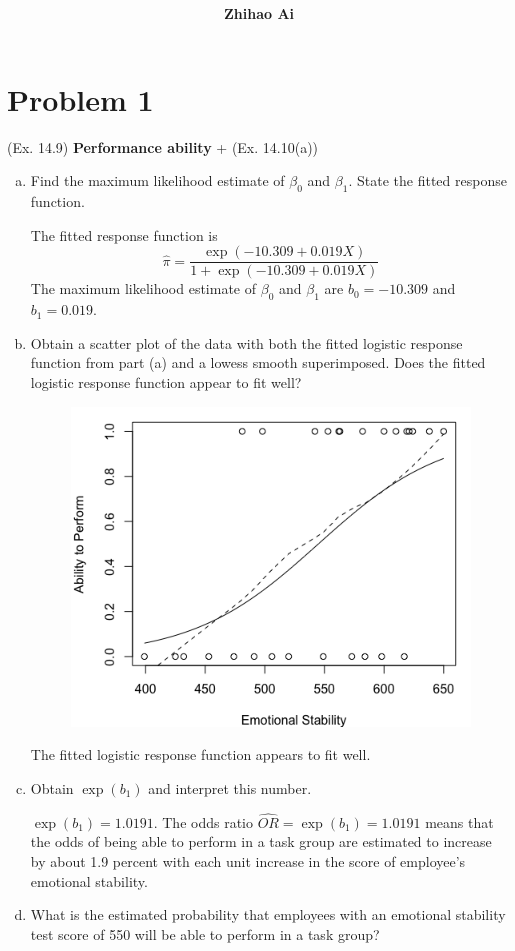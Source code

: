 \documentclass[10pt]{report}
\title{
	\vspace{2in}
	\textmd{\textbf{\hwCourse\\\hwTitle}}\\
	\vspace{0.3in}\large{\textit{\hmClassInstructor}}
	\vspace{3in}
}
\author{\textbf{Zhihao Ai}}
\date{}
\begin{document}
\maketitle

\section*{Problem 1}
(Ex. 14.9) \textbf{Performance ability} + (Ex. 14.10(a))
\begin{enumerate}[a.]
	\item 
	Find the maximum likelihood estimate of $\beta_0$ and $\beta_1$. State the fitted response function.
	
	The fitted response function is 
	\[
	\hat{\pi} = \frac{\exp(-10.309 + 0.019X)}{1 + \exp(-10.309 + 0.019X)}
	\]
	The maximum likelihood estimate of $\beta_0$ and $\beta_1$ are $b_0 = -10.309$ and $b_1 = 0.019$.
	
	\item 
	Obtain a scatter plot of the data with both the fitted logistic response function from part (a) and a lowess smooth superimposed. Does the fitted logistic response function appear to fit well?
	\begin{figure}[H]
		\centering
		\includegraphics[width=.5\linewidth]{p1/9b.png}
	\end{figure}
	The fitted logistic response function appears to fit well.
	
	\item 
	Obtain $\exp(b_1)$ and interpret this number.
	
	$\exp(b_1) = 1.0191$. The odds ratio $\widehat{OR} = \exp(b_1) = 1.0191$ means that the odds of being able to perform in a task group are estimated to increase by about 1.9 percent with each unit increase in the score of employee's emotional stability.
	
	\item 
	What is the estimated probability that employees with an emotional stability test score of 550 will be able to perform in a task group?
	

\end{enumerate}
\end{document}
